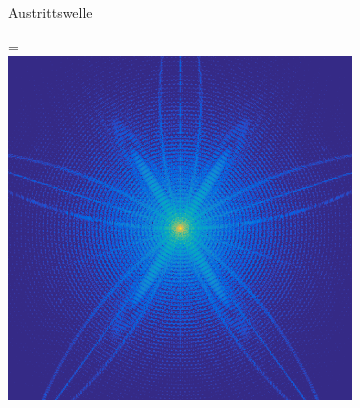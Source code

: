 \begin{figure}
\begin{subfigure}[b]{0.49\textwidth}
		\caption{Austrittswelle}
		\label{fig:komplexexit}
	\end{subfigure}
	\begin{subfigure}[b]{0.49\textwidth}
		=\hbox{\includegraphics[width=\textwidth]{images/fig_simholo_v2_scatter.png}}

\end{subfigure}
\end{figure}
